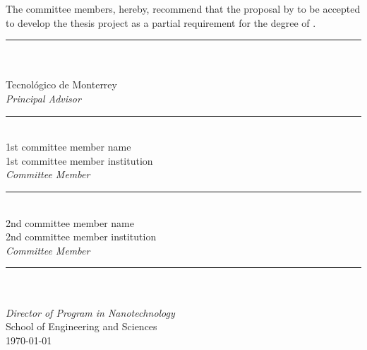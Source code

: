 \documentclass[
11pt, 
english,
singlespacing,
parskip,
headsepline,
]{MastersDoctoralThesis}
\begin{document}
\begin{committee}
\addchaptertocentry{\supervisingcommittee} %
The committee members, hereby, recommend that the proposal by \authorname to be accepted to develop the thesis project as a partial requirement for the degree of \degreename.

\vfill

\begin{flushright} \large

\bigskip
\bigskip
\bigskip
\bigskip
\bigskip

\noindent \rule[0.5em]{15em}{0.5pt}\\ %
\supname\\
Tecnológico de Monterrey\\
\emph{Principal Advisor}

\bigskip
\bigskip
\bigskip
\bigskip
\bigskip

\noindent \rule[0.5em]{15em}{0.5pt}\\ %
1st committee member name\\
1st committee member institution\\
\emph{Committee Member}

\bigskip
\bigskip
\bigskip
\bigskip
\bigskip

\noindent \rule[0.5em]{15em}{0.5pt}\\ %
2nd committee member name\\
2nd committee member institution\\
\emph{Committee Member}

\end{flushright}

\vfill

\begin{center}

\bigskip
\bigskip
\bigskip
\bigskip
\bigskip

\noindent \rule[0.5em]{15em}{0.5pt}\\ %
\cosupname \\
\emph{Director of Program in Nanotechnology}\\
School of Engineering and Sciences\\

\bigskip
\bigskip
{\addressname \text{, } \large \today}\\[4cm]

\end{center}
\end{committee}
\end{document}
